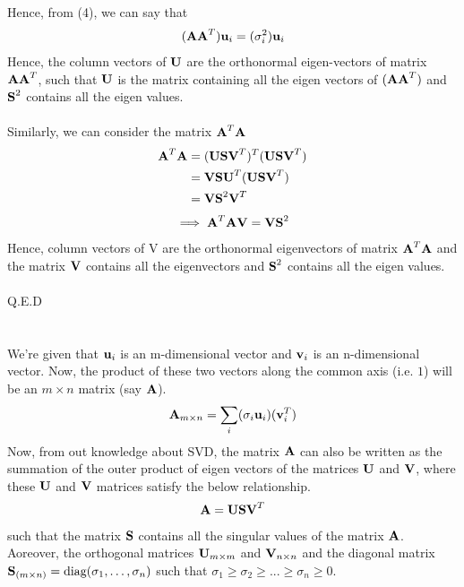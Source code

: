 \documentclass[12pt, a4paper]{article}
\begin{document}
Hence, from (4), we can say that
\begin{align*}
    (\textbf{A}\textbf{A}^T) \textbf{u}_i = (\sigma_i^2) \textbf{u}_i
\end{align*}
Hence, the column vectors of $\textbf{U}$ are the orthonormal eigen-vectors of matrix $\textbf{A}\textbf{A}^T$, such that $\textbf{U}$ is the matrix containing all the eigen vectors of $(\textbf{A}\textbf{A}^T)$ and $\textbf{S}^2$ contains all the eigen values. \\ \\
Similarly, we can consider the matrix $\textbf{A}^T\textbf{A}$ 
\begin{align*}
    \textbf{A}^T\textbf{A} &= (\textbf{U}\textbf{S}\textbf{V}^T) ^T(\textbf{U}\textbf{S}\textbf{V}^T) \\
    &= \textbf{V}\textbf{S}\textbf{U}^T(\textbf{U}\textbf{S}\textbf{V}^T) \\
    &= \textbf{V}\textbf{S}^2\textbf{V}^T
\end{align*}
\begin{align*}
    \implies \textbf{A}^T \textbf{A} \textbf{V} = \textbf{V} \textbf{S}^2
\end{align*}
Hence, column vectors of V are the orthonormal eigenvectors of matrix $\textbf{A}^T \textbf{A}$ and the matrix $\textbf{V}$ contains all the eigenvectors and $\textbf{S}^2$ contains all the eigen values.\\ \\
\hspace*{\fill} Q.E.D

\newpage
\section{}
We're given that $\textbf{u}_i$ is an m-dimensional vector and $\textbf{v}_i$ is an n-dimensional vector. Now, the product of these two vectors along the common axis (i.e. $1$) will be an $m \times n$ matrix (say $\textbf{A}$).
\begin{align}
    \textbf{A}_{m \times n} = \sum_{i}(\sigma_i\textbf{u}_i) (\textbf{v}_i^T)
\end{align}
Now, from out knowledge about SVD, the matrix $\textbf{A}$ can also be written as the summation of the outer product of eigen vectors of the matrices $\textbf{U}$ and $\textbf{V}$, where these $\textbf{U}$ and $\textbf{V}$ matrices satisfy the below relationship.
\begin{align*}
    \textbf{A} = \textbf{U}\textbf{S}\textbf{V}^T
\end{align*}
such that the matrix $\textbf{S}$ contains all the singular values of the matrix $\textbf{A}$.
Aoreover, the orthogonal matrices $\textbf{U}_{m \times m}$ and $\textbf{V}_{n \times n}$ and the diagonal matrix $\textbf{S}_{(m \times n)} = \text{diag} (\sigma_1, \ldots , \sigma_n)$ such that $\sigma_1 \geq \sigma_2 \geq . . . \geq \sigma_n \geq 0$.
\end{document}
